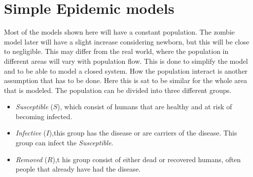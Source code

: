 \documentclass[%
twoside,                 %
final,                   %
10pt]{article}
\begin{document}
\section{Simple Epidemic models}
Most of the models shown here will have a constant population. The zombie model later will have a slight increase considering newborn, but this will be close to negligible. This may differ from the real world, where the population in different areas will vary with population flow. This is done to simplify the model and to be able to model a closed system. How the population interact is another assumption that has to be done. Here this is sat to be similar for the whole area that is modeled. The population can be divided into three different groups. 
\begin{itemize}
\item \emph{Susceptible} ($S$), which consist of humans that are healthy and at risk of becoming infected. 

\item \emph{Infective} ($I$),this group has the disease or are carriers of the disease. This group can infect the \emph{Susceptible}. 

\item \emph{Removed} ($R$),t his group consist of either dead or recovered humans, often people that already have had the disease. 
\end{itemize}
\end{document}

